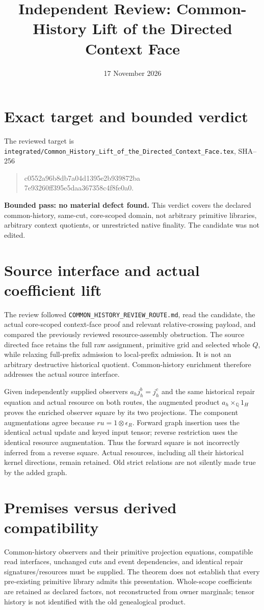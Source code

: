 \documentclass{article}
\title{Independent Review: Common-History Lift of the Directed Context Face}
\date{17 November 2026}
\begin{document}
\maketitle
\section*{Exact target and bounded verdict}
The reviewed target is \texttt{integrated/Common\_History\_Lift\_of\_the\_Directed\_Context\_Face.tex}, SHA--256
\begin{quote}\ttfamily\small
c0552a96b8db7a04d1395e2b939872ba\\7e93260ff395e5daa367358c4f8fe0a0.
\end{quote}
\textbf{Bounded pass: no material defect found.} This verdict covers the declared common-history, same-cut, core-scoped domain, not arbitrary primitive libraries, arbitrary context quotients, or unrestricted native finality. The candidate was not edited.

\section*{Source interface and actual coefficient lift}
The review followed \texttt{COMMON\_HISTORY\_REVIEW\_ROUTE.md}, read the candidate, the actual core-scoped context-face proof and relevant relative-crossing payload, and compared the previously reviewed resource-assembly obstruction. The source directed face retains the full raw assignment, primitive grid and selected whole $Q$, while relaxing full-prefix admission to local-prefix admission. It is not an arbitrary destructive historical quotient. Common-history enrichment therefore addresses the actual source interface.

Given independently supplied observers $a_hj_h^b=j_h^c$ and the same historical repair equation and actual resource on both routes, the augmented product $a_h\times_{\mathbb Q}1_H$ proves the enriched observer square by its two projections. The component augmentations agree because $ru=1\otimes\epsilon_R$. Forward graph insertion uses the identical actual update and keyed input tensor; reverse restriction uses the identical resource augmentation. Thus the forward square is not incorrectly inferred from a reverse square. Actual resources, including all their historical kernel directions, remain retained. Old strict relations are not silently made true by the added graph.

\section*{Premises versus derived compatibility}
Common-history observers and their primitive projection equations, compatible read interfaces, unchanged cuts and event dependencies, and identical repair signatures/resources must be supplied. The theorem does not establish that every pre-existing primitive library admits this presentation. Whole-scope coefficients are retained as declared factors, not reconstructed from owner marginals; tensor history is not identified with the old genealogical product.
\end{document}
